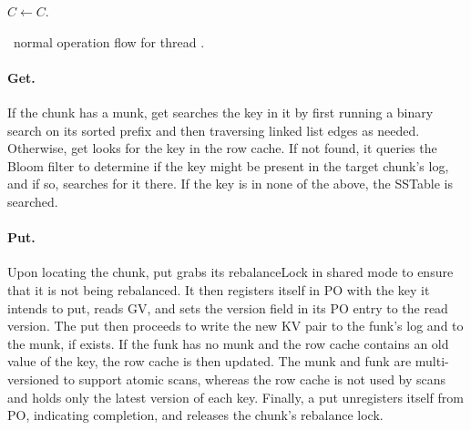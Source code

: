 \begin{algorithm}[tb]
\begin{algorithmic}[1]{}
			\State $C \leftarrow C$. 
\EndProcedure	
\end{algorithmic}
\caption{\sys\ normal operation flow for thread .}
\label{alg:ops}
\end{algorithm}



\paragraph{Get.}
If the chunk has a munk, {get} searches the key in it by first running a binary search on its sorted prefix and then traversing linked list edges as needed. 
Otherwise,  {get} looks for the key in the {row cache}. If not found, it queries 
the {Bloom filter} to determine if the key might be present in the target chunk's  
 {log}, and if so, searches for it there.  If the key is in none of the above, the {SSTable} is searched.


\paragraph{Put.}
Upon locating the chunk,  {put} grabs its {rebalanceLock} in shared mode to ensure that it is not being rebalanced.
It then registers itself in PO with the key it intends to put,
reads GV, and sets the version field in its PO entry to the read version. 
The {put} then proceeds to write the new KV pair to the  funk's {log} and to the 
munk, if exists. 
If the funk has no munk and the row cache contains an old value of the key, the row cache is then updated.
The munk and funk are multi-versioned to support atomic scans, 
whereas the row cache is not used by scans and holds only the latest version of each key. 
Finally, a put unregisters itself from PO, indicating completion, and releases the chunk's rebalance lock.

